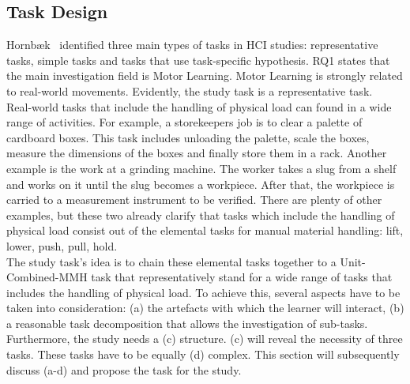 \subsection{Task Design}
Hornb\ae{}k~\cite{hornbaek} identified three main types of tasks in HCI studies: representative tasks, simple tasks and tasks that use task-specific hypothesis. RQ1 states that the main investigation field is Motor Learning. Motor Learning is strongly related to real-world movements. Evidently, the study task is a representative task.\\
Real-world tasks that include the handling of physical load can found in a wide range of activities. For example, a storekeepers job is to clear a palette of cardboard boxes. This task includes unloading the palette, scale the boxes, measure the dimensions of the boxes and finally store them in a rack. Another example is the work at a grinding machine. The worker takes a slug from a shelf and works on it until the slug becomes a workpiece. After that, the workpiece is carried to a measurement instrument to be verified. There are plenty of other examples, but these two already clarify that tasks which include the handling of physical load consist out of the elemental tasks for manual material handling: lift, lower, push, pull, hold.\\
The study task's idea is to chain these elemental tasks together to a Unit-Combined-MMH task that representatively stand for a wide range of tasks that includes the handling of physical load. To achieve this, several aspects have to be taken into consideration: (a) the artefacts with which the learner will interact, (b) a reasonable task decomposition that allows the investigation of sub-tasks. Furthermore, the study needs a (c) structure. (c) will reveal the necessity of three tasks. These tasks have to be equally (d) complex. This section will subsequently discuss (a-d) and propose the task for the study.


